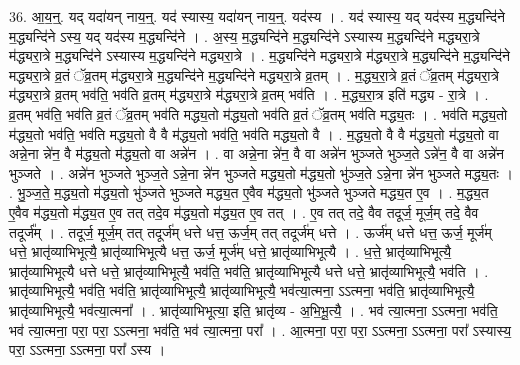 \documentclass[17pt]{extarticle}
\begin{document}
36. आ॒य॒न्॒. यद् यदा॑यन् नाय॒न्॒. यद॑ स्यास्य॒ यदा॑यन् नाय॒न्॒. यद॑स्य । . यद॑ स्यास्य॒ यद् यद॑स्य म॒द्ध्यन्दि॑ने म॒द्ध्यन्दि॑ने ऽस्य॒ यद् यद॑स्य म॒द्ध्यन्दि॑ने । . अ॒स्य॒ म॒द्ध्यन्दि॑ने म॒द्ध्यन्दि॑ने ऽस्यास्य म॒द्ध्यन्दि॑ने मद्ध्यरा॒त्रे म॑द्ध्यरा॒त्रे म॒द्ध्यन्दि॑ने ऽस्यास्य म॒द्ध्यन्दि॑ने मद्ध्यरा॒त्रे । . म॒द्ध्यन्दि॑ने मद्ध्यरा॒त्रे म॑द्ध्यरा॒त्रे म॒द्ध्यन्दि॑ने म॒द्ध्यन्दि॑ने मद्ध्यरा॒त्रे व्र॒तं ॅव्र॒तम् म॑द्ध्यरा॒त्रे म॒द्ध्यन्दि॑ने म॒द्ध्यन्दि॑ने मद्ध्यरा॒त्रे व्र॒तम् । . म॒द्ध्य॒रा॒त्रे व्र॒तं ॅव्र॒तम् म॑द्ध्यरा॒त्रे म॑द्ध्यरा॒त्रे व्र॒तम् भव॑ति॒ भव॑ति व्र॒तम् म॑द्ध्यरा॒त्रे म॑द्ध्यरा॒त्रे व्र॒तम् भव॑ति । . म॒द्ध्य॒रा॒त्र इति॑ मद्ध्य - रा॒त्रे । . व्र॒तम् भव॑ति॒ भव॑ति व्र॒तं ॅव्र॒तम् भव॑ति मद्ध्य॒तो म॑द्ध्य॒तो भव॑ति व्र॒तं ॅव्र॒तम् भव॑ति मद्ध्य॒तः । . भव॑ति मद्ध्य॒तो म॑द्ध्य॒तो भव॑ति॒ भव॑ति मद्ध्य॒तो वै वै म॑द्ध्य॒तो भव॑ति॒ भव॑ति मद्ध्य॒तो वै । . म॒द्ध्य॒तो वै वै म॑द्ध्य॒तो म॑द्ध्य॒तो वा अन्ने॒ना न्ने॑न॒ वै म॑द्ध्य॒तो म॑द्ध्य॒तो वा अन्ने॑न । . वा अन्ने॒ना न्ने॑न॒ वै वा अन्ने॑न भुञ्जते भुञ्ज॒ते ऽन्ने॑न॒ वै वा अन्ने॑न भुञ्जते । . अन्ने॑न भुञ्जते भुञ्ज॒ते ऽन्ने॒ना न्ने॑न भुञ्जते मद्ध्य॒तो म॑द्ध्य॒तो भु॑ञ्ज॒ते ऽन्ने॒ना न्ने॑न भुञ्जते मद्ध्य॒तः । . भु॒ञ्ज॒ते॒ म॒द्ध्य॒तो म॑द्ध्य॒तो भु॑ञ्जते भुञ्जते मद्ध्य॒त ए॒वैव म॑द्ध्य॒तो भु॑ञ्जते भुञ्जते मद्ध्य॒त ए॒व । . म॒द्ध्य॒त ए॒वैव म॑द्ध्य॒तो म॑द्ध्य॒त ए॒व तत् तदे॒व म॑द्ध्य॒तो म॑द्ध्य॒त ए॒व तत् । . ए॒व तत् तदे॒ वैव तदूर्ज॒ मूर्ज॒म् तदे॒ वैव तदूर्ज᳚म् । . तदूर्ज॒ मूर्ज॒म् तत् तदूर्ज॑म् धत्ते धत्त॒ ऊर्ज॒म् तत् तदूर्ज॑म् धत्ते । . ऊर्ज॑म् धत्ते धत्त॒ ऊर्ज॒ मूर्ज॑म् धत्ते॒ भ्रातृ॑व्याभिभूत्यै॒ भ्रातृ॑व्याभिभूत्यै धत्त॒ ऊर्ज॒ मूर्ज॑म् धत्ते॒ भ्रातृ॑व्याभिभूत्यै । . ध॒त्ते॒ भ्रातृ॑व्याभिभूत्यै॒ भ्रातृ॑व्याभिभूत्यै धत्ते धत्ते॒ भ्रातृ॑व्याभिभूत्यै॒ भव॑ति॒ भव॑ति॒ भ्रातृ॑व्याभिभूत्यै धत्ते धत्ते॒ भ्रातृ॑व्याभिभूत्यै॒ भव॑ति । . भ्रातृ॑व्याभिभूत्यै॒ भव॑ति॒ भव॑ति॒ भ्रातृ॑व्याभिभूत्यै॒ भ्रातृ॑व्याभिभूत्यै॒ भव॑त्या॒त्मना॒ ऽऽत्मना॒ भव॑ति॒ भ्रातृ॑व्याभिभूत्यै॒ भ्रातृ॑व्याभिभूत्यै॒ भव॑त्या॒त्मना᳚ । . भ्रातृ॑व्याभिभूत्या॒ इति॒ भ्रातृ॑व्य - अ॒भि॒भू॒त्यै॒ । . भव॑ त्या॒त्मना॒ ऽऽत्मना॒ भव॑ति॒ भव॑ त्या॒त्मना॒ परा॒ परा॒ ऽऽत्मना॒ भव॑ति॒ भव॑ त्या॒त्मना॒ परा᳚ । . आ॒त्मना॒ परा॒ परा॒ ऽऽत्मना॒ ऽऽत्मना॒ परा᳚ ऽस्यास्य॒ परा॒ ऽऽत्मना॒ ऽऽत्मना॒ परा᳚ ऽस्य । \newline
\pagebreak
{}
\end{document}
